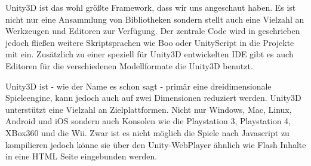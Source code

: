 Unity3D ist das wohl größte Framework, dass wir uns angeschaut haben. Es ist nicht nur eine Ansammlung von Bibliotheken sondern stellt auch eine Vielzahl an Werkzeugen und Editoren zur Verfügung. Der zentrale Code wird in \CS geschrieben jedoch fließen weitere Skriptsprachen wie Boo oder UnityScript in die Projekte mit ein.
Zusätzlich zu einer speziell für Unity3D entwickelten IDE gibt es auch Editoren für die verschiedenen Modellformate die Unity3D benutzt.

Unity3D ist - wie der Name es schon sagt - primär eine dreidimensionale Spieleengine, kann jedoch auch auf zwei Dimensionen reduziert werden.
Unity3D unterstützt eine Vielzahl an Zielplattformen. Nicht nur Windows, Mac, Linux, Android und iOS sondern auch Konsolen wie die Playstation 3, Playstation 4, XBox360 und die Wii. Zwar ist es nicht möglich die Spiele nach Javascript zu kompilieren jedoch könne sie über den Unity-WebPlayer ähnlich wie Flash Inhalte in eine HTML Seite eingebunden werden.